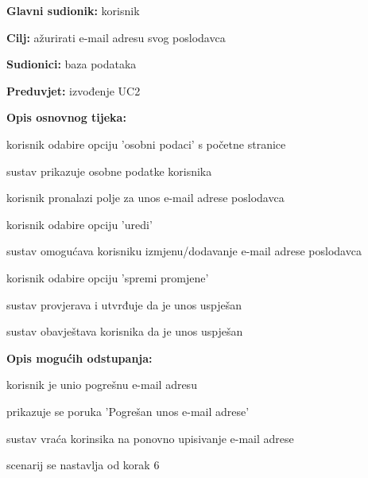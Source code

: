 					\noindent {}
					\begin{packed_item}
	
						\item \textbf{Glavni sudionik: }korisnik
						\item  \textbf{Cilj:} ažurirati e-mail adresu svog poslodavca
						\item  \textbf{Sudionici:} baza podataka
						\item  \textbf{Preduvjet:} izvođenje UC2
						\item  \textbf{Opis osnovnog tijeka:}
						
						\item[] \begin{packed_enum}
	
							\item korisnik odabire opciju 'osobni podaci' s početne stranice
							\item sustav prikazuje osobne podatke korisnika 
							\item korisnik pronalazi polje za unos e-mail adrese poslodavca
							\item korisnik odabire opciju 'uredi'
							\item sustav omogućava korisniku izmjenu/dodavanje e-mail adrese poslodavca
							\item korisnik odabire opciju 'spremi promjene'
							\item sustav provjerava i utvrđuje da je unos uspješan
							\item sustav obavještava korisnika da je unos uspješan
			
						\end{packed_enum}
						
						\item  \textbf{Opis mogućih odstupanja:}
						
						\item[] \begin{packed_item}
							\item[7.a] korisnik je unio pogrešnu e-mail adresu 
							\item[] 
							\begin{packed_enum} 
								\item prikazuje se poruka 'Pogrešan unos e-mail adrese'
								\item sustav vraća korinsika na ponovno upisivanje e-mail adrese
								\item scenarij se nastavlja od korak 6
								
							\end{packed_enum}
						\end{packed_item}
						
					\end{packed_item}

